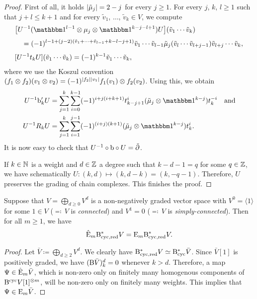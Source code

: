\documentclass[\MainFolder/Text.tex]{subfiles}
\begin{document}
\begin{proof} 
First of all, it holds $|\tilde{\mu}_j| = 2 - j$ for every $j\ge 1$. For every $j$, $k$, $l\ge 1$ such that $j+l \le k+1$ and for every $\tilde{v}_1$, $\dotsc$, $\tilde{v}_k \in V$, we compute
\begin{align*}
&\bigl[U^{-1}(\Id^{l-1}\otimes \mu_j \otimes \Id^{k-j-l+1})U\bigr](\tilde{v}_1\dotsb \tilde{v}_k) \\[\jot] &\quad = (-1)^{l-1 + (j-2)(\tilde{v}_1 + \dotsb + \tilde{v}_{l-1} + k - l - j +1)} \tilde{v}_1\dotsb\tilde{v}_{l-1}\tilde{\mu}_j(\tilde{v}_l\dotsb \tilde{v}_{l+j-1})\tilde{v}_{l+j}\dotsb \tilde{v}_k, \\[\jot]
& [U^{-1} t_k U](\tilde{v}_1\dotsb \tilde{v}_k) = (-1)^{k-1} \tilde{v}_1 \dotsb \tilde{v}_k,
\end{align*}
where we use the Koszul convention $(f_1\otimes f_2)(v_1\otimes v_2) = (-1)^{|f_2||v_1|} f_1(v_1)\otimes f_2(v_2)$. Using this, we obtain
\begin{align*}
U^{-1} \Hd'_k U &= \sum_{j=1}^k \sum_{i=0}^{k-1} (-1)^{i+j(i+k+1)} t^i_{k-j+1}(\tilde{\mu}_j \otimes \Id^{k-j})t_k^{-i}\quad\text{and} \\
U^{-1} R_k U &= \sum_{j=1}^k \sum_{i=1}^{j-1} (-1)^{(i+j)(k+1)} (\tilde{\mu}_j\otimes \Id^{k-j})t_k^i.
\end{align*}
It is now easy to check that $U^{-1}\circ \mathrm{b}\circ U = \tilde{\partial}$.

If $k\in \mathbb{N}$ is a weight and $d\in\mathbb{Z}$ a degree such that $k-d-1 = q$ for some $q\in \mathbb{Z}$, we have schematically $U: (k,d)\mapsto (k, d - k) = (k,-q-1)$. Therefore, $U$ preserves the grading of chain complexes. This finishes the proof.
\end{proof}



\begin{Proposition}\label{Prop:SimplCon}
Suppose that $V = \bigoplus_{d\ge 0} V^d$ is a non-negatively graded vector space with $V^0=\langle 1 \rangle$ for some $1\in V$ ($\eqqcolon$\,$V$ is \emph{connected}) and $V^1 = 0$ ($\eqqcolon$\,$V$ is \emph{simply-connected}). Then for all $m\ge 1$, we have
$$ \hat{\mathrm{E}}_m \mathrm{B}_{\mathrm{cyc},\mathrm{red}}^* V = \mathrm{E}_m \mathrm{B}_{\mathrm{cyc},\mathrm{red}}^* V. $$
\end{Proposition}
\begin{proof}
Let $\bar{V}\coloneqq \bigoplus_{d\ge 2} V^d$. We clearly have $\mathrm{B}_{\mathrm{cyc},\mathrm{red}}^* V \simeq \mathrm{B}_{\mathrm{cyc}}^* \bar{V}$. Since $\bar{V}[1]$ is positively graded, we have $(\mathrm{B} \bar{V})_{k}^d = 0$ whenever $k>d$. Therefore, a map $\Psi\in \hat{\mathrm{E}}_m \bar{V}$, which is non-zero only on finitely many homogenous components of $\mathrm{B}^{\mathrm{cyc}} V[1]^{\otimes m}$, will be non-zero only on finitely many weights. This implies that $\Psi\in \mathrm{E}_m \bar{V}$.
\end{proof}
\end{document}
